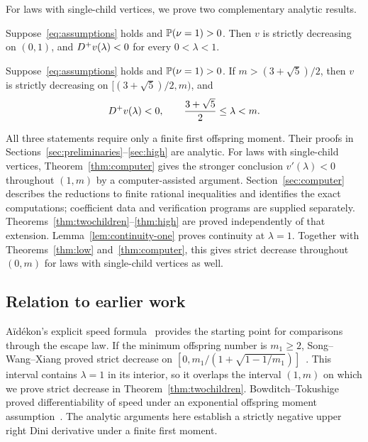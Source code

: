 For laws with single-child vertices, we prove two complementary analytic results.

\begin{theorem}\label{thm:low}
Suppose~\eqref{eq:assumptions} holds and $\mathbb P(\nu=1)>0$. Then $v$ is strictly decreasing on $(0,1)$, and $D^{+} v(\lambda)<0$ for every $0<\lambda<1$.
\end{theorem}

\begin{theorem}\label{thm:high}
Suppose~\eqref{eq:assumptions} holds and $\mathbb P(\nu=1)>0$. If $m>(3+\sqrt5)/2$, then $v$ is strictly decreasing on $[(3+\sqrt5)/2,m)$, and
\begin{equation*}
 D^{+} v(\lambda)<0,\qquad \frac{3+\sqrt5}{2}\le\lambda<m.
\end{equation*}
\end{theorem}

All three statements require only a finite first offspring moment. Their proofs in Sections~\ref{sec:preliminaries}--\ref{sec:high} are analytic. For laws with single-child vertices, Theorem~\ref{thm:computer} gives the stronger conclusion $v'(\lambda)<0$ throughout $(1,m)$ by a computer-assisted argument. Section~\ref{sec:computer} describes the reductions to finite rational inequalities and identifies the exact computations; coefficient data and verification programs are supplied separately. Theorems~\ref{thm:twochildren}--\ref{thm:high} are proved independently of that extension. Lemma~\ref{lem:continuity-one} proves continuity at $\lambda=1$. Together with Theorems~\ref{thm:low} and~\ref{thm:computer}, this gives strict decrease throughout $(0,m)$ for laws with single-child vertices as well.

\subsection{Relation to earlier work}
A\"id\'ekon's explicit speed formula~\cite{Aidekon} provides the starting point for comparisons through the escape law. If the minimum offspring number is $m_1\ge2$, Song--Wang--Xiang proved strict decrease on $[0,m_1/(1+\sqrt{1-1/m_1})]$~\cite[Theorem~1.2]{SWX}. This interval contains $\lambda=1$ in its interior, so it overlaps the interval $(1,m)$ on which we prove strict decrease in Theorem~\ref{thm:twochildren}. Bowditch--Tokushige proved differentiability of speed under an exponential offspring moment assumption~\cite[Theorem~1.1]{BT}. The analytic arguments here establish a strictly negative upper right Dini derivative under a finite first moment.

